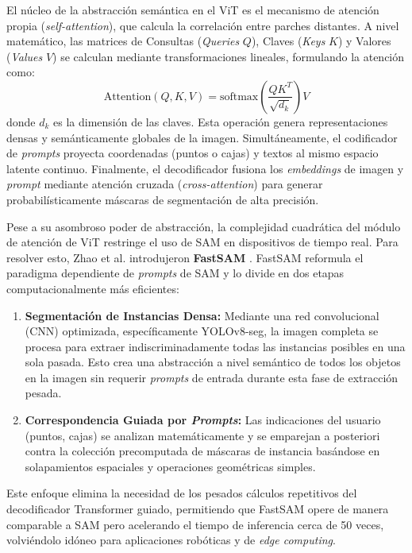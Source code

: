 El núcleo de la abstracción semántica en el ViT es el mecanismo de atención propia (\textit{self-attention}), que calcula la correlación entre parches distantes. A nivel matemático, las matrices de Consultas (\textit{Queries} $Q$), Claves (\textit{Keys} $K$) y Valores (\textit{Values} $V$) se calculan mediante transformaciones lineales, formulando la atención como:
\begin{equation}
\text{Attention}(Q, K, V) = \text{softmax}\left(\frac{QK^T}{\sqrt{d_k}}\right)V
\end{equation}
donde $d_k$ es la dimensión de las claves. Esta operación genera representaciones densas y semánticamente globales de la imagen. Simultáneamente, el codificador de \textit{prompts} proyecta coordenadas (puntos o cajas) y textos al mismo espacio latente continuo. Finalmente, el decodificador fusiona los \textit{embeddings} de imagen y \textit{prompt} mediante atención cruzada (\textit{cross-attention}) para generar probabilísticamente máscaras de segmentación de alta precisión.

Pese a su asombroso poder de abstracción, la complejidad cuadrática del módulo de atención de ViT restringe el uso de SAM en dispositivos de tiempo real. Para resolver esto, Zhao et al. introdujeron \textbf{FastSAM} \cite{zhao2023fast}. FastSAM reformula el paradigma dependiente de \textit{prompts} de SAM y lo divide en dos etapas computacionalmente más eficientes:
\begin{enumerate}
    \item \textbf{Segmentación de Instancias Densa:} Mediante una red convolucional (CNN) optimizada, específicamente YOLOv8-seg, la imagen completa se procesa para extraer indiscriminadamente todas las instancias posibles en una sola pasada. Esto crea una abstracción a nivel semántico de todos los objetos en la imagen sin requerir \textit{prompts} de entrada durante esta fase de extracción pesada.
    \item \textbf{Correspondencia Guiada por \textit{Prompts}:} Las indicaciones del usuario (puntos, cajas) se analizan matemáticamente y se emparejan a posteriori contra la colección precomputada de máscaras de instancia basándose en solapamientos espaciales y operaciones geométricas simples.
\end{enumerate}
Este enfoque elimina la necesidad de los pesados cálculos repetitivos del decodificador Transformer guiado, permitiendo que FastSAM opere de manera comparable a SAM pero acelerando el tiempo de inferencia cerca de 50 veces, volviéndolo idóneo para aplicaciones robóticas y de \textit{edge computing}.

